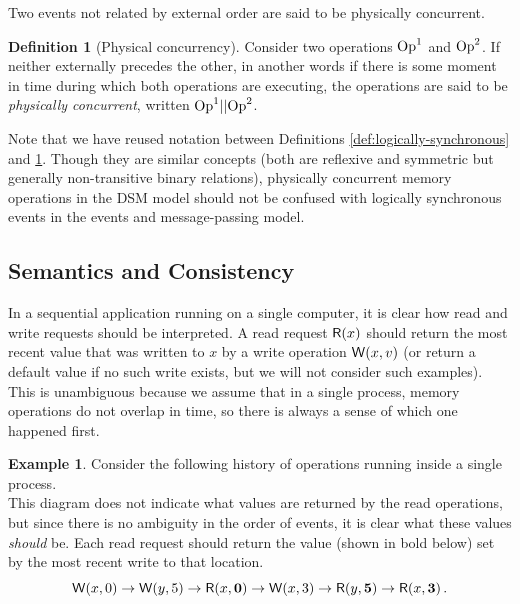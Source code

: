 \documentclass[]             %
{NASA}                       %
\theoremstyle{definition}
\newtheorem{example}[theorem]{Example}
\newtheorem{definition}[theorem]{Definition}
\begin{document}
Two events not related by external order are said to be physically
concurrent.

\begin{definition}[Physical concurrency]
  \label{def:physical-concurrency}
  Consider two operations $\mathrm{Op}^1$ and $\mathrm{Op}^2$. If neither externally
  precedes the other, in another words if there is some moment in time
  during which both operations are executing, the operations are said
  to be \emph{physically concurrent}, written $\mathrm{Op}^1 || \mathrm{Op}^2$.
\end{definition}

Note that we have reused notation between Definitions
\ref{def:logically-synchronous} and \ref{def:physical-concurrency}.
Though they are similar concepts (both are reflexive and symmetric but
generally non-transitive binary relations), physically concurrent
memory operations in the DSM model should not be confused with
logically synchronous events in the events and message-passing model.

\subsection{Semantics and Consistency}
In a sequential application running on a single computer, it is clear
how read and write requests should be interpreted. A read request
$\mathsf{R}\!\left(x\right)$ should return the most recent value that was written to
$x$ by a write operation $\mathsf{W}\!\left(x, v\right)$ (or return a default value
if no such write exists, but we will not consider such examples). This
is unambiguous because we assume that in a single process, memory
operations do not overlap in time, so there is always a sense of which
one happened first. %

\begin{example}
  Consider the following history of operations running inside a single process.
  \[\]
  This diagram does not indicate what values are returned by the read
  operations, but since there is no ambiguity in the order of events,
  it is clear what these values \emph{should} be. Each read request
  should return the value (shown in bold below) set by the most recent
  write to that location.
  \[ \mathsf{W}\!\left(x, 0\right) \to \mathsf{W}\!\left(y, 5\right) \to \mathsf{R}\!\left(x, \textbf{0}\right) \to \mathsf{W}\!\left(x, 3\right) \to \mathsf{R}\!\left(y, \textbf{5}\right) \to \mathsf{R}\!\left(x, \textbf{3}\right). \]
\end{example}
\end{document}
